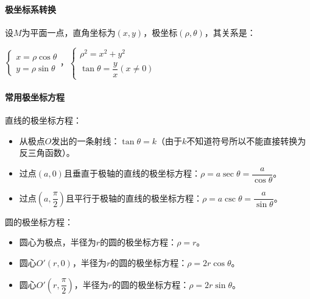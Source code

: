 \documentclass[UTF8, 12pt]{ctexart}
\begin{document}
        \paragraph{极坐标系转换} \leavevmode \medskip

        设$M$为平面一点，直角坐标为$(x,y)$，极坐标$(\rho,\theta)$，其关系是：\medskip

        $\left\{\begin{array}{l}
                    x=\rho\cos\theta \\
                    y=\rho\sin\theta
        \end{array}\right.$，$\left\{\begin{array}{l}
                                        \rho^2=x^2+y^2 \\
                                        \tan\theta=\dfrac{y}{x}(x\neq0)
        \end{array}\right.$\medskip

        \paragraph{常用极坐标方程} \leavevmode \medskip

        直线的极坐标方程：

        \begin{itemize}
            \item 从极点$O$发出的一条射线：$\tan\theta=k$（由于$k$不知道符号所以不能直接转换为反三角函数）。
            \item 过点$(a,0)$且垂直于极轴的直线的极坐标方程：$\rho=a\sec\theta=\dfrac{a}{\cos\theta}$。
            \item 过点$\left(a,\dfrac{\pi}{2}\right)$且平行于极轴的直线的极坐标方程：$\rho=a\csc\theta=\dfrac{a}{\sin\theta}$。
        \end{itemize}

        圆的极坐标方程：

        \begin{itemize}
            \item 圆心为极点，半径为$r$的圆的极坐标方程：$\rho=r$。
            \item 圆心$O'(r,0)$，半径为$r$的圆的极坐标方程：$\rho=2r\cos\theta$。
            \item 圆心$O'\left(r,\dfrac{\pi}{2}\right)$，半径为$r$的圆的极坐标方程：$\rho=2r\sin\theta$。
        \end{itemize}
\end{document}
